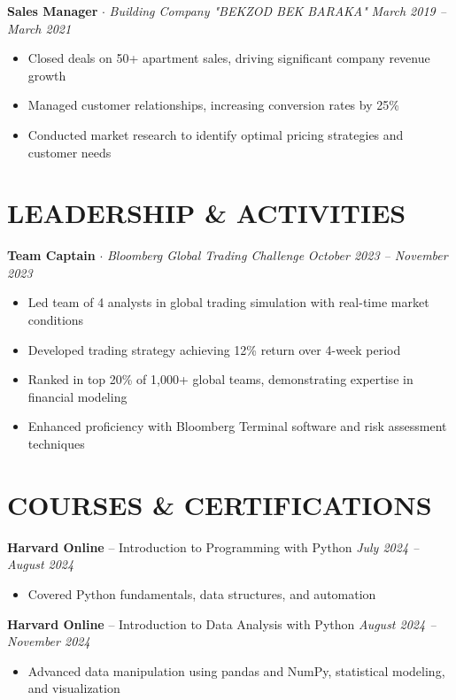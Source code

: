 \documentclass[11pt,a4paper]{article}
\begin{document}
\textbf{Sales Manager} $\cdot$ \textit{Building Company "BEKZOD BEK BARAKA"} \hfill \textit{March 2019 -- March 2021}
\begin{itemize}
    \item Closed deals on 50+ apartment sales, driving significant company revenue growth
    \item Managed customer relationships, increasing conversion rates by 25\%
    \item Conducted market research to identify optimal pricing strategies and customer needs
\end{itemize}

\section*{LEADERSHIP \& ACTIVITIES}

\textbf{Team Captain} $\cdot$ \textit{Bloomberg Global Trading Challenge} \hfill \textit{October 2023 -- November 2023}
\begin{itemize}
    \item Led team of 4 analysts in global trading simulation with real-time market conditions
    \item Developed trading strategy achieving 12\% return over 4-week period
    \item Ranked in top 20\% of 1,000+ global teams, demonstrating expertise in financial modeling
    \item Enhanced proficiency with Bloomberg Terminal software and risk assessment techniques
\end{itemize}

\section*{COURSES \& CERTIFICATIONS}

\textbf{Harvard Online} -- Introduction to Programming with Python \hfill \textit{July 2024 -- August 2024}
\begin{itemize}
    \item Covered Python fundamentals, data structures, and automation
\end{itemize}

\textbf{Harvard Online} -- Introduction to Data Analysis with Python \hfill \textit{August 2024 -- November 2024}
\begin{itemize}
    \item Advanced data manipulation using pandas and NumPy, statistical modeling, and visualization
\end{itemize}
\end{document}
